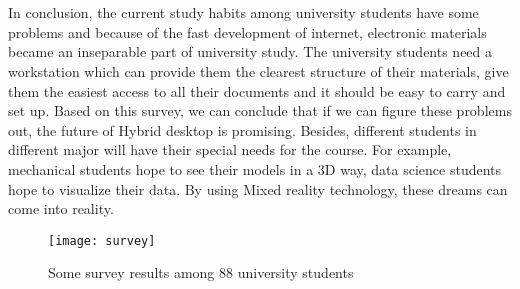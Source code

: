 \\
\\
In conclusion, the current study habits among university students have some problems and because of the fast development of internet, electronic materials became an inseparable part of university study. The university students need a workstation which can provide them the clearest structure of their materials, give them the easiest access to all their documents and it should be easy to carry and set up. Based on this survey, we can conclude that if we can figure these problems out, the future of Hybrid desktop is promising. Besides, different students in different major will have their special needs for the course. For example, mechanical students hope to see their models in a 3D way, data science students hope to visualize their data. By using Mixed reality technology, these dreams can come into reality.
\begin{figure}[h]
    \centering
	\texttt{[image: survey]}
    \caption{Some survey results among 88 university students}
    \label{fig:mesh1}
\end{figure}

